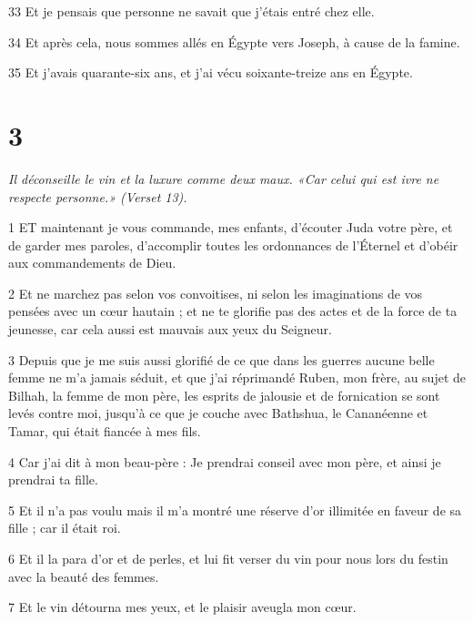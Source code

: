 \par 33 Et je pensais que personne ne savait que j'étais entré chez elle.

\par 34 Et après cela, nous sommes allés en Égypte vers Joseph, à cause de la famine.

\par 35 Et j'avais quarante-six ans, et j'ai vécu soixante-treize ans en Égypte.

\chapter{3}

\par \textit{Il déconseille le vin et la luxure comme deux maux. «Car celui qui est ivre ne respecte personne.» (Verset 13).}

\par 1 ET maintenant je vous commande, mes enfants, d'écouter Juda votre père, et de garder mes paroles, d'accomplir toutes les ordonnances de l'Éternel et d'obéir aux commandements de Dieu.

\par 2 Et ne marchez pas selon vos convoitises, ni selon les imaginations de vos pensées avec un cœur hautain ; et ne te glorifie pas des actes et de la force de ta jeunesse, car cela aussi est mauvais aux yeux du Seigneur.

\par 3 Depuis que je me suis aussi glorifié de ce que dans les guerres aucune belle femme ne m'a jamais séduit, et que j'ai réprimandé Ruben, mon frère, au sujet de Bilhah, la femme de mon père, les esprits de jalousie et de fornication se sont levés contre moi, jusqu'à ce que je couche avec Bathshua, le Cananéenne et Tamar, qui était fiancée à mes fils.

\par 4 Car j'ai dit à mon beau-père : Je prendrai conseil avec mon père, et ainsi je prendrai ta fille.

\par 5 Et il n'a pas voulu mais il m'a montré une réserve d'or illimitée en faveur de sa fille ; car il était roi.

\par 6 Et il la para d'or et de perles, et lui fit verser du vin pour nous lors du festin avec la beauté des femmes.

\par 7 Et le vin détourna mes yeux, et le plaisir aveugla mon cœur.

